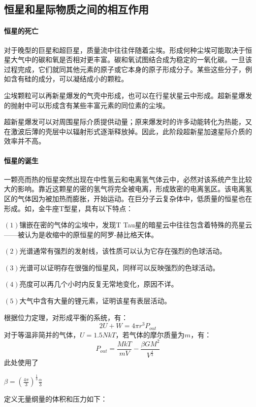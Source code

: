 \subsection{恒星和星际物质之间的相互作用}
\paragraph{恒星的死亡}
对于晚型的巨星和超巨星，质量流中往往伴随着尘埃。形成何种尘埃可能取决于恒星大气中的碳和氧是否相对更丰富。碳和氧试图结合成为稳定的一氧化碳。一旦该过程完成，它们就同其他元素的原子或它本身的原子形成分子。某些这些分子，例如含有硅的成分，可以凝结成小的颗粒。

尘埃颗粒可以再新星爆发的气壳中形成，也可以在行星状星云中形成。超新星爆发的抛射中可以形成含有某些丰富元素的同位素的尘埃。

超新星爆发可以对周围星际介质提供动量；原来爆发时的许多动能转化为热能，又在激波后薄的壳层中以辐射形式逐渐释放掉。因此，此阶段超新星加速星际介质的效率并不高。
\paragraph{恒星的诞生}
一颗亮而热的恒星突然出现在中性氢云和电离氢气体云中，必然对该系统产生比较大的影响。靠近这颗星的密的氢气将完全被电离，形成致密的电离氢区。该电离氢区的气体因为被加热而膨胀，开始运动。在巨分子云复杂体中，低质量的恒星也在形成。如，金牛座T型星，具有以下特点：

$\left(1\right)$镶嵌在密的气体的尘埃中，发现T Tau星的暗星云中往往包含着特殊的亮星云——被认为是收缩中的原恒星的阿罗-赫比格天体。

$\left(2\right)$光谱通常有强烈的发射线，该性质可以认为它存在强烈的色球活动。

$\left(3\right)$光谱可以证明存在很强的恒星风，同样可以反映强烈的色球活动。

$\left(4\right)$亮度可以再几个小时内反复无常地变化，原因不详。

$\left(5\right)$大气中含有大量的锂元素，证明该星有表层活动。

根据位力定理，对形成平衡的系统，有：
\begin{equation}
	2U+W=4\pi r^3P_{out}
\end{equation}
对于等温非简并的气体，$U=1.5NkT$，若气体的摩尔质量为$m$，有：
\begin{equation}
	P_{out}=\frac{MkT}{mV}-\frac{\beta GM^2}{V^{\frac{4}{3}}}
\end{equation}
此处使用了\begin{large}
	$\beta =\left(\frac{4\pi}{3}\right)^{\frac{1}{3}}\frac{\alpha}{3}$
\end{large}
定义无量纲量的体积和压力如下：

